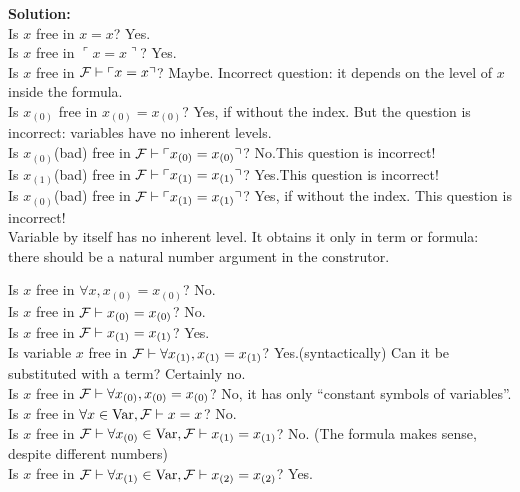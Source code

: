 \textbf{Solution:}\\
Is $x$ free in $x=x$? Yes.\\
Is $x$ free in $\ulcorner x=x \urcorner$? Yes.\\
Is $x$ free in ${\mathcal{F}} \vdash  \ulcorner x=x \urcorner$? Maybe. Incorrect question: it depends on the level of $x$ inside the formula.\\
Is $x_{(0)}$ free in $x_{(0)}=x_{(0)}$? Yes, if without the index. But the question is incorrect: variables have no inherent levels.\\
Is $x_{(0)}$(bad) free in ${\mathcal{F}} \vdash  \ulcorner x_{(0)}=x_{(0)} \urcorner$? No.This question is incorrect!\\
Is $x_{(1)}$(bad) free in ${\mathcal{F}} \vdash  \ulcorner x_{(1)}=x_{(1)} \urcorner$? Yes.This question is incorrect!\\%
Is $x_{(0)}$(bad) free in ${\mathcal{F}} \vdash  \ulcorner x_{(1)}=x_{(1)} \urcorner$? %
Yes, if without the index. This question is incorrect!\\
Variable by itself has no inherent level. It obtains it only in term or formula: there should be a natural number argument in the construtor.



Is $x$ free in $\forall x, x_{(0)}=x_{(0)}$? No.\\
Is $x$ free in ${\mathcal{F}} \vdash x_{(0)}=x_{(0)}$? No.\\
Is $x$ free in ${\mathcal{F}} \vdash x_{(1)}=x_{(1)}$? Yes.\\
Is variable $x$ free in ${\mathcal{F}} \vdash  \forall x_{(1)}, x_{(1)}=x_{(1)}$? Yes.(syntactically) Can it be substituted with a term? Certainly no.\\

Is $x$ free in ${\mathcal{F}} \vdash \forall x_{(0)}, x_{(0)}=x_{(0)}$? No, it has only ``constant symbols of variables''.\\

Is $x$ free in $\forall x\in\mathrm{Var}, {\mathcal{F}} \vdash x=x$? No.\\
Is $x$ free in ${\mathcal{F}} \vdash \forall x_{(0)}\in\mathrm{Var}, {\mathcal{F}} \vdash x_{(1)}=x_{(1)}$? No. (The formula makes sense, despite different numbers)\\
Is $x$ free in ${\mathcal{F}} \vdash \forall x_{(1)}\in\mathrm{Var}, {\mathcal{F}} \vdash x_{(2)}=x_{(2)}$? Yes.\\



